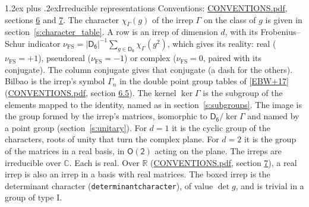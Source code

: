 \documentclass[10pt,a4paper]{article}
\makeatletter
\renewcommand\section{\@startsection{section}{1}{\z@}{-3ex plus -1ex minus -.2ex}%
  {1.2ex plus .2ex}{\normalfont\large\sffamily\bfseries\color{parttitle}}}
\numberwithin{equation}{section}
\newcommand{\grp}[1]{\mathsf{#1}}
\newcommand{\irchar}[1]{\chi_{#1}}
\newcommand{\fsind}{\nu_{\mathrm{FS}}}
\makeatother
\begin{document}
\section{Irreducible representations}\label{s:irreps}
Conventions: \href{../../CONVENTIONS.pdf}{CONVENTIONS.pdf}, sections \href{../../CONVENTIONS.pdf\#conv.6}{6} and \href{../../CONVENTIONS.pdf\#conv.7}{7}.
\leavevmode\label{n:function.character}\label{n:irrep.Gamma}The character $\irchar{\Gamma}(g)$ of the irrep $\Gamma$ on the class of $g$ is given in section~\ref{s:character_table}.
\leavevmode\label{n:index.dimension}\label{n:index.frobenius}\label{n:head.irrep}\label{n:head.reality}A row is an irrep of dimension $d$, with its Frobenius--Schur indicator $\fsind = |\grp{D_{6}}|^{-1}\allowbreak\sum_{g\in\grp{D_{6}}}\irchar{\Gamma}(g^2)$, which gives its reality: real ($\fsind = +1$), pseudoreal ($\fsind = -1$) or complex ($\fsind = 0$, paired with its conjugate). \label{n:head.conjugate}The column conjugate gives that conjugate (a dash for the others). \label{n:head.bilbao}\label{n:irrep.alias.gamma}Bilbao is the irrep's symbol $\Gamma_n$ in the double point group tables of [\href{../../../REFERENCES.pdf\#ref.EBW+17}{EBW+17}] (\href{../../CONVENTIONS.pdf}{CONVENTIONS.pdf}, section \href{../../CONVENTIONS.pdf\#conv.6.5}{6.5}). \label{n:head.kernel}The kernel $\ker\Gamma$ is the subgroup of the elements mapped to the identity, named as in section~\ref{s:subgroups}. \label{n:head.image}The image is the group formed by the irrep's matrices, isomorphic to $\grp{D_{6}}/\ker\Gamma$ and named by a point group (section~\ref{s:unitary}). For $d = 1$ it is the cyclic group of the characters, roots of unity that turn the complex plane. For $d = 2$ it is the group of the matrices in a real basis, in $\grp{O(2)}$ acting on the plane. The irreps are irreducible over $\mathbb{C}$. Each is real. Over $\mathbb{R}$ (\href{../../CONVENTIONS.pdf}{CONVENTIONS.pdf}, section \href{../../CONVENTIONS.pdf\#conv.7}{7}), a real irrep is also an irrep in a basis with real matrices. \label{n:mark.determinant}The boxed irrep is the determinant character (\texttt{determinantcharacter}), of value $\det g$, and is trivial in a group of type I.
\setlength{\emergencystretch}{2em}\par\setlength{\emergencystretch}{0pt}
\end{document}
